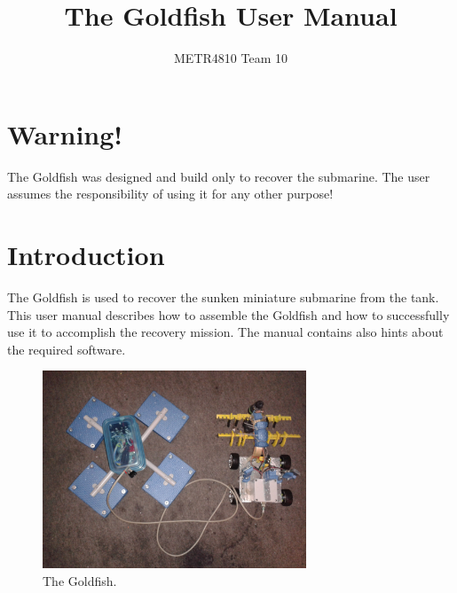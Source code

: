 \documentclass[letterpaper, 12 pt]{article}
\begin{document}
\title{The Goldfish User Manual}
\author{METR4810 Team 10}
\maketitle
\pagestyle{empty}


\newpage
\vspace*{13cm}
\section*{Warning!}
The Goldfish was designed and build only to recover the submarine. The user assumes the responsibility of using it for any other purpose!

\newpage
\tableofcontents
\newpage

\section{Introduction}
The Goldfish is used to recover the sunken miniature submarine from the tank. This user manual describes how to assemble the Goldfish and how to successfully use it to accomplish the recovery mission. The manual contains also hints about the required software.

\begin{figure}[H]
  \caption{The Goldfish.}
  \centering
    \includegraphics[width=0.7\textwidth]{20170529_053543}
\end{figure}
\end{document}
